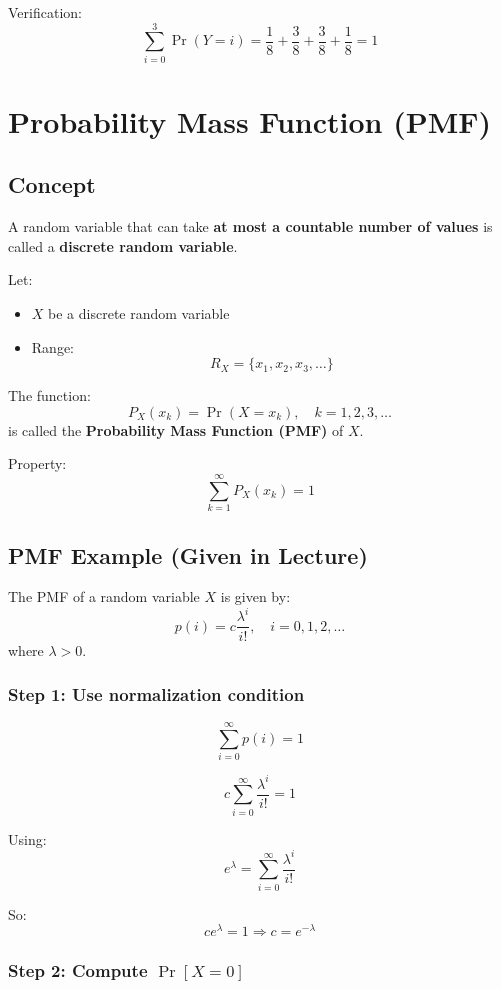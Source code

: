 \documentclass[11pt]{article}
\begin{document}
Verification:
\[
\sum_{i=0}^{3} \Pr(Y=i) = \frac{1}{8}+\frac{3}{8}+\frac{3}{8}+\frac{1}{8} = 1
\]

\section{Probability Mass Function (PMF)}

\subsection{Concept}

A random variable that can take \textbf{at most a countable number of values} is called a \textbf{discrete random variable}.

Let:
\begin{itemize}
    \item $X$ be a discrete random variable
    \item Range:
    \[
    R_X = \{x_1, x_2, x_3, \dots\}
    \]
\end{itemize}

The function:
\[
P_X(x_k) = \Pr(X = x_k), \quad k = 1,2,3,\dots
\]
is called the \textbf{Probability Mass Function (PMF)} of $X$.

Property:
\[
\sum_{k=1}^{\infty} P_X(x_k) = 1
\]

\subsection{PMF Example (Given in Lecture)}

The PMF of a random variable $X$ is given by:
\[
p(i) = c \frac{\lambda^i}{i!}, \quad i = 0,1,2,\dots
\]
where $\lambda > 0$.

\subsubsection*{Step 1: Use normalization condition}

\[
\sum_{i=0}^{\infty} p(i) = 1
\]

\[
c \sum_{i=0}^{\infty} \frac{\lambda^i}{i!} = 1
\]

Using:
\[
e^\lambda = \sum_{i=0}^{\infty} \frac{\lambda^i}{i!}
\]

So:
\[
c e^\lambda = 1
\Rightarrow c = e^{-\lambda}
\]

\subsubsection*{Step 2: Compute $\Pr[X = 0]$}
\end{document}
